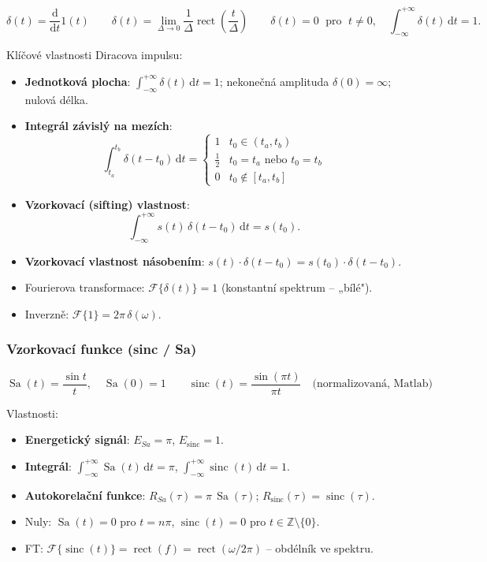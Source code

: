 \documentclass[12pt,a4paper]{article}
\newcommand{\FT}{\mathcal{F}}
\newcommand{\sinc}{\operatorname{sinc}}
\newcommand{\rect}{\operatorname{rect}}
\newcommand{\dd}{\mathrm{d}}
\begin{document}
\begin{matBox}
\[
  \delta(t) = \frac{\dd}{\dd t}1(t)
  \qquad
  \delta(t) = \lim_{\Delta\to 0}\frac{1}{\Delta}\rect\!\left(\frac{t}{\Delta}\right)
  \qquad
  \delta(t) = 0 \;\text{ pro }\; t \neq 0, \quad \int_{-\infty}^{+\infty} \delta(t)\,\dd t = 1.
\]
\end{matBox}

Klíčové vlastnosti Diracova impulsu:
\begin{itemize}
  \item \textbf{Jednotková plocha}: $\int_{-\infty}^{+\infty}\delta(t)\,\dd t = 1$; nekonečná amplituda $\delta(0)=\infty$; nulová délka.
  \item \textbf{Integrál závislý na mezích}:
    \[
      \int_{t_a}^{t_b}\delta(t-t_0)\,\dd t = \begin{cases} 1 & t_0 \in (t_a, t_b) \\ \tfrac{1}{2} & t_0 = t_a \text{ nebo } t_0=t_b \\ 0 & t_0 \notin [t_a, t_b] \end{cases}
    \]
  \item \textbf{Vzorkovací (sifting) vlastnost}:
    \[
      \int_{-\infty}^{+\infty} s(t)\,\delta(t - t_0)\,\dd t = s(t_0).
    \]
  \item \textbf{Vzorkovací vlastnost násobením}: $s(t)\cdot\delta(t-t_0) = s(t_0)\cdot\delta(t-t_0)$.
  \item Fourierova transformace: $\FT\{\delta(t)\} = 1$ (konstantní spektrum – „bílé").
  \item Inverzně: $\FT\{1\} = 2\pi\,\delta(\omega)$.
\end{itemize}

\subsubsection*{Vzorkovací funkce (sinc / Sa)}

\begin{matBox}[Definice]
\[
  \operatorname{Sa}(t) = \frac{\sin t}{t}, \quad \operatorname{Sa}(0) = 1
  \qquad
  \sinc(t) = \frac{\sin(\pi t)}{\pi t} \quad \text{(normalizovaná, Matlab)}
\]
\end{matBox}

Vlastnosti:
\begin{itemize}
  \item \textbf{Energetický signál}: $E_{Sa} = \pi$, $E_{\sinc} = 1$.
  \item \textbf{Integrál}: $\int_{-\infty}^{+\infty}\operatorname{Sa}(t)\,\dd t = \pi$, $\int_{-\infty}^{+\infty}\sinc(t)\,\dd t = 1$.
  \item \textbf{Autokorelační funkce}: $R_{Sa}(\tau) = \pi\,\operatorname{Sa}(\tau)$; $R_{\sinc}(\tau) = \sinc(\tau)$.
  \item Nuly: $\operatorname{Sa}(t) = 0$ pro $t = n\pi$, $\sinc(t)=0$ pro $t \in \mathbb{Z}\setminus\{0\}$.
  \item FT: $\FT\{\sinc(t)\} = \rect(f) = \rect(\omega/2\pi)$ – obdélník ve spektru.
\end{itemize}
\end{document}
